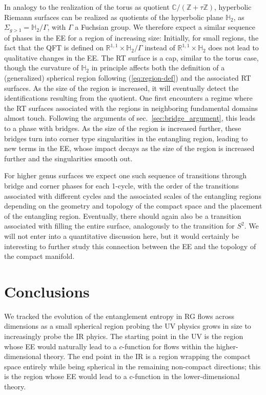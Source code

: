 \documentclass[11 pt]{article}
\def\CC{{\mathds{C}}}
\def\RR{{\mathds{R}}}
\def\ZZ{{\mathds{Z}}}
\begin{document}
In analogy to the realization of the torus as quotient $\CC/(\ZZ+\tau\ZZ)$, hyperbolic Riemann surfaces can be realized as quotients of the hyperbolic plane $\mathds{H}_2$, as $\Sigma_{g>1}=\mathds{H}_2/\Gamma$, with $\Gamma$ a Fuchsian group. We therefore expect a similar sequence of phases in the EE for a region of increasing size: Initially, for small regions, the fact that the QFT is defined on $\RR^{1,1}\times \mathds{H}_2/\Gamma$ instead of $\RR^{1,1}\times \mathds{H}_2$ does not lead to qualitative changes in the EE. The RT surface is a cap, similar to the torus case, though the curvature of $\mathds{H}_2$ in principle affects both the definition of a (generalized) spherical region following (\ref{eq:region-def}) and the associated RT surfaces.
%
As the size of the region is increased, it will eventually detect the identifications resulting from the quotient. One first encounters a regime where the RT surfaces associated with the regions in neighboring fundamental domains almost touch. Following the arguments of sec.~\ref{sec:bridge_argument}, this leads to a phase with bridges.
As the size of the region is increased further, these bridges turn into corner type singularities in the entangling region, leading to new terms in the EE, whose impact decays as the size of the region is increased further and the singularities smooth out.

For higher genus surfaces we expect one such sequence of transitions through bridge and corner phases for each 1-cycle, with the order of the transitions associated with different cycles and the associated scales of the entangling regions depending on the geometry and topology of the compact space and the placement of the entangling region. Eventually, there should again also be a transition associated with filling the entire surface, analogously to the transition for $S^2$. We will not enter into a quantitative discussion here, but it would certainly be interesting to further study this connection between the EE and the topology of the compact manifold.


\section{Conclusions}\label{Sec:Conclusions}

We tracked the evolution of the entanglement entropy in RG flows across dimensions as a small spherical region probing the UV physics grows in size to increasingly probe the IR phyics. The starting point in the UV is the region whose EE would naturally lead to a $c$-function for flows within the higher-dimensional theory. The end point in the IR is a region wrapping the compact space entirely while being spherical in the remaining non-compact directions; this is the region whose EE would lead to a c-function in the lower-dimensional theory. 
\end{document}
